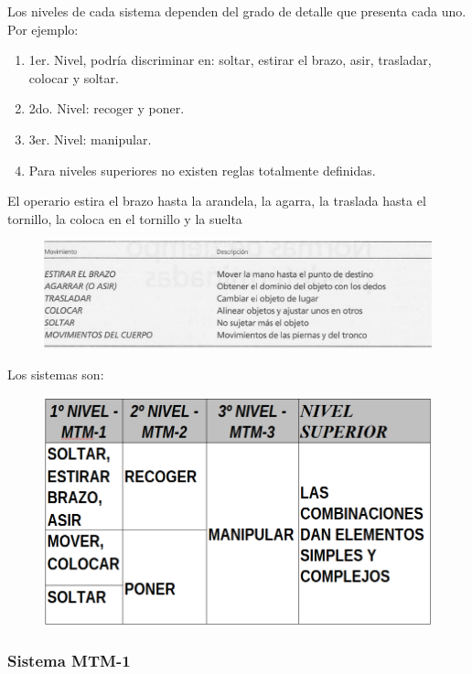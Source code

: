 \documentclass[a4paper,oneside,11pt]{article}
\begin{document}
Los niveles de cada sistema dependen del grado de detalle que presenta cada uno. Por ejemplo:
\begin{enumerate}
    \item 1er. Nivel, podría discriminar en: soltar, estirar el brazo, asir, trasladar, colocar y soltar. 
    \item 2do. Nivel: recoger y poner.
    \item 3er. Nivel: manipular. 
    \item Para niveles superiores no existen reglas totalmente definidas.
\end{enumerate}

El operario estira el brazo hasta la arandela, la agarra, la traslada hasta el tornillo, la coloca en el tornillo y la suelta

\begin{figure} [ht!]
    \centering
    \includegraphics[scale=.65]{movimientos.png}
\end{figure}

Los sistemas son:

\begin{figure} [ht!]
    \centering
    \includegraphics[width=0.6\linewidth]{mtm.png}
\end{figure}

\subsubsection{Sistema MTM-1}
\end{document}
